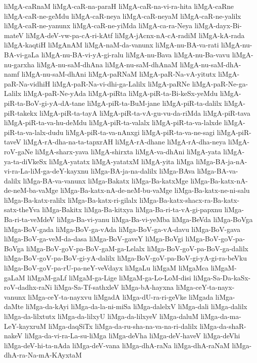 {liMgA-caRnaM
liMgA-caR-na-paraH
liMgA-caR-na-vi-ra-hita
liMgA-caRne
liMgA-caR-ne-geMdu
liMgA-caR-neya
liMgA-caR-neyaM
liMgA-caR-ne-yalilx
liMgA-caR-ne-yanunx
liMgA-caR-ne-yiMda
liMgA-ca-ra-Neya
liMgA-dayx-Bi-mateV
liMgA-deV-vw-pa-cA-ri-kAtf
liMgA-jAcnx-nA-cA-radiM
liMgA-kA-rada
liMgA-kaqtiH
liMgAnAM
liMgA-naM-da-vanunx
liMgA-nu-BA-va-rati
liMgA-nu-BA-vi-gaLa
liMgA-nu-BA-vi-yA-gi-ralu
liMgA-nu-Bava
liMgA-nu-Ba-vavu
liMgA-nu-garxha
liMgA-nu-saM-dhAna
liMgA-nu-saM-dhAnaM
liMgA-nu-saM-dhA-namf
liMgA-nu-saM-dhAni
liMgA-paRNaM
liMgA-paR-Na-vA-yitutx
liMgA-paR-Na-vidhiH
liMgA-paR-Na-vi-dhi-ga-Lalilx
liMgA-paRNe
liMgA-paR-Ne-ga-Lalilx
liMgA-paR-Ne-yAda
liMgA-piRta
liMgA-piR-ta-Bi-keSx-yeMdu
liMgA-piR-ta-BoV-gi-yA-dA-tane
liMgA-piR-ta-BuM-jane
liMgA-piR-ta-dalilx
liMgA-piR-takekx
liMgA-piR-ta-tayA
liMgA-piR-ta-vA-gu-vu-da-riMda
liMgA-piR-tava
liMgA-piR-ta-va-hu-deMdu
liMgA-piR-ta-valalx
liMgA-piR-ta-va-lalxde
liMgA-piR-ta-va-lalx-dudu
liMgA-piR-ta-va-nAnxgi
liMgA-piR-ta-va-ne-sagi
liMgA-piR-taveV
liMgA-rA-dha-na-ta-tapxrAH
liMgA-rA-dhane
liMgA-rA-dha-neya
liMgA-roV-gaNe
liMgA-sharx-yava
liMgA-shirxta
liMgA-va-dhAni
liMgA-yata
liMgA-ya-ta-diVkeSx
liMgA-yatatx
liMgA-yatatxM
liMgA-yita
liMga
liMga-BA-ja-nA-vi-ra-La-liM-ga-deY-kayxnu
liMga-BA-ja-na-dalilx
liMga-BAva
liMga-BA-va-dalilx
liMga-BA-va-vanunx
liMga-Bakatx
liMga-Ba-katxMge
liMga-Ba-katx-nA-de-neM-ba-vaMge
liMga-Ba-katx-nA-de-neM-bu-vaMge
liMga-Ba-katx-ne-ni-salu
liMga-Ba-katx-ralilx
liMga-Ba-katx-ri-gilalx
liMga-Ba-katx-shacx-ra-Ba-katx-satx-theYva
liMga-Bakitx
liMga-Ba-kitxya
liMga-Ba-ri-ta-vA-gi-papxnu
liMga-Ba-ri-ta-veMdeV
liMga-Ba-vi-yanu
liMga-Ba-vi-yeMba
liMga-BeVda
liMga-BoVga
liMga-BoV-gada
liMga-BoV-ga-vAda
liMga-BoV-ga-vA-davu
liMga-BoV-gava
liMga-BoV-ga-veM-da-dasa
liMga-BoV-gaveY
liMga-BoVgi
liMga-BoV-goV-pa-BoVga
liMga-BoV-goV-pa-BoV-gaM-ga-Lelalx
liMga-BoV-goV-pa-BoV-ga-dalilx
liMga-BoV-goV-pa-BoV-gi-yA-dalilx
liMga-BoV-goV-pa-BoV-gi-yA-gi-ra-beVku
liMga-BoV-goV-pa-rU-pa-neY-veVdayx
liMgaLu
liMgaM
liMgaMca
liMgaM-gaLaM
liMgaM-gaLf
liMgaM-ga-Lige
liMgaM-ga-Lo-LoM-disi
liMga-Sa-Da-kaSx-roV-dadhx-raNi
liMga-Sa-Tf-sathxleV
liMga-bA-hayxna
liMga-ceY-ta-nayx-vanunx
liMga-ceY-ta-nayxvu
liMgadA
liMga-dU-ra-ri-geVke
liMgada
liMga-daMte
liMga-da-kAyi
liMga-da-la-ni-miSa
liMga-dalelxV
liMga-dali
liMga-dalilx
liMga-da-lilxtutx
liMga-da-lilxyU
liMga-da-lilxyeV
liMga-daluM
liMga-da-ma-LeY-kayxruM
liMga-daqSiTx
liMga-da-ru-sha-na-va-na-ri-dalilx
liMga-da-shaR-nakeV
liMga-da-vi-ra-La-su-liMga
liMga-deVha
liMga-deV-haveV
liMga-deVhi
liMga-deV-hi-ta-nAda
liMga-deV-vana
liMga-dhA-raNa
liMga-dhA-raNaM
liMga-dhA-ra-Na-mA-KAyxtaM
}
